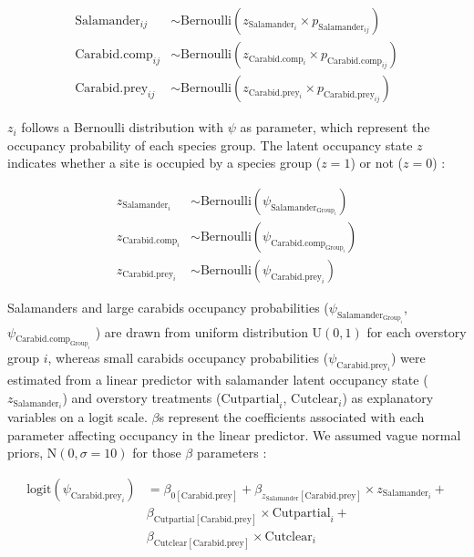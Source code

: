 \begin{align}
  \text{Salamander}_{ij} &\sim \text{Bernoulli}(z_{\text{Salamander}_i} \times p_{\text{Salamander}_{ij}}) \nonumber \\
  \text{Carabid.comp}_{ij} &\sim \text{Bernoulli}(z_{\text{Carabid.comp}_i} \times p_{\text{Carabid.comp}_{ij}})  \\
  \text{Carabid.prey}_{ij} &\sim \text{Bernoulli}(z_{\text{Carabid.prey}_i} \times p_{\text{Carabid.prey}_{ij}}) \nonumber
\end{align}


$z_{i}$ follows a Bernoulli distribution with $\psi$ as parameter, 
which represent the occupancy probability of each species group. 
The latent occupancy state $z$ indicates whether a site is occupied by a species group ($z = 1$) or not ($z = 0$) :


\begin{align}
  z_{\text{Salamander}_i} &\sim \text{Bernoulli}(\psi_{\text{Salamander}_{\text{Group}_i}}) \nonumber \\
  z_{\text{Carabid.comp}_i} &\sim \text{Bernoulli}(\psi_{\text{Carabid.comp}_{\text{Group}_i}}) \\
  z_{\text{Carabid.prey}_i} &\sim \text{Bernoulli}(\psi_{\text{Carabid.prey}_{i}}) \nonumber
\end{align}


Salamanders and large carabids occupancy probabilities ($\psi_{\text{Salamander}_{\text{Group}_i}}$, $\psi_{\text{Carabid.comp}_{\text{Group}_i}}$ ) are drawn from uniform distribution $\text{U}(0, 1)$ for each overstory group $i$, 
whereas small carabids occupancy probabilities ($\psi_{\text{Carabid.prey}_{i}}$) were estimated from a linear predictor with salamander latent occupancy state ($z_{\text{Salamander}_i}$) and overstory treatments 
($\text{Cutpartial}_i$, $\text{Cutclear}_i$) as explanatory variables on a logit scale. 
$\beta$s represent the coefficients associated with each parameter affecting occupancy in the linear predictor. 
We assumed vague normal priors, $\text{N}(0, \sigma = 10)$ for those $\beta$ parameters :


\begin{align}
  \text{logit}(\psi_{\text{Carabid.prey}_i}) &= \beta_{0[\text{Carabid.prey}]} + \beta_{z_{\text{Salamander}}[\text{Carabid.prey}]} \times z_{\text{Salamander}_i} + \nonumber \\
  &\beta_{\text{Cutpartial}[\text{Carabid.prey}]} \times \text{Cutpartial}_i + \\
  &\beta_{\text{Cutclear}[\text{Carabid.prey}]} \times \text{Cutclear}_i \nonumber
\end{align}

